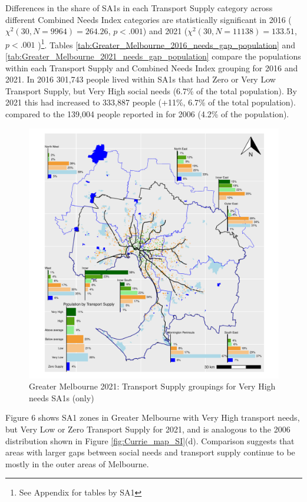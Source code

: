 \documentclass[preprint, 3p,
authoryear]{elsarticle} %
\begin{document}
Differences in the share of SA1s in each Transport Supply category
across different Combined Needs Index categories are statistically
significant in 2016 (\(\chi^2(30, N = 9964) = 264.26\), \(p < .001\))
and 2021 (\(\chi^2(30, N = 11138) = 133.51\), \(p < .001\) )\footnote{See
  Appendix for tables by SA1}. Tables
\ref{tab:Greater_Melbourne_2016_needs_gap_population} and
\ref{tab:Greater_Melbourne_2021_needs_gap_population} compare the
populations within each Transport Supply and Combined Needs Index
grouping for 2016 and 2021. In 2016 301,743 people lived within SA1s
that had Zero or Very Low Transport Supply, but Very High social needs
(6.7\% of the total population). By 2021 this had increased to 333,887
people (+11\%, 6.7\% of the total population). compared to the 139,004
people reported in \citet{currie2010identifying} for 2006 (4.2\% of the
population).

\begin{figure}
\centering
\includegraphics{ReynoldsCurrieQu2024_files/figure-latex/Greater_Melbourne_2021_needs_gap_map_figure-1.pdf}
\caption{Greater Melbourne 2021: Transport Supply groupings for Very
High needs SA1s (only)}
\end{figure}

Figure 6 shows SA1 zones in Greater Melbourne with Very High transport
needs, but Very Low or Zero Transport Supply for 2021, and is analogous
to the 2006 distribution shown in Figure \ref{fig:Currie_map_SI}(d).
Comparison suggests that areas with larger gaps between social needs and
transport supply continue to be mostly in the outer areas of Melbourne.
\end{document}
